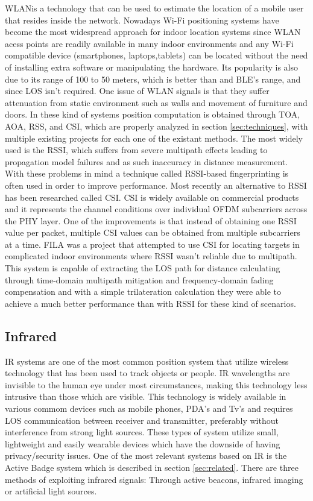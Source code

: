 \ac{WLAN}is a technology that can be used to estimate the location of a mobile user that resides inside the network. Nowadays Wi-Fi positioning systems have become the most widespread approach for indoor location systems since \ac{WLAN} acess points are readily available in many indoor environments and any Wi-Fi compatible device (smartphones, laptops,tablets) can be located without the need of installing extra software or manipulating the hardware. Its popularity is also due to its range of 100 to 50 meters, which is better than  and BLE's range, and since \ac{LOS} isn't required. One issue of \ac{WLAN} signals is that they suffer attenuation from static environment such as walls and movement of furniture and doors. In these kind of systems position computation is obtained through TOA, AOA, RSS, and CSI, which are properly analyzed in section \ref{sec:techniques}, with multiple existing projects for each one of the existant methods. The most widely used is the \ac{RSSI}, which suffers from severe multipath effects leading to propagation model failures and as such inaccuracy in distance measurement. With these problems in mind a technique called RSSI-based fingerprinting is often used in order to improve performance.
Most recently an alternative to RSSI has been researched called \ac{CSI}. \ac{CSI} is widely available on commercial products and it represents the channel conditions over individual OFDM subcarriers across the \ac{PHY} layer. One of the improvements is that instead of obtaining one \ac{RSSI} value per packet, multiple \ac{CSI} values can be obtained from multiple subcarriers at a time. FILA \cite{fila} was a project that attempted to use \ac{CSI} for locating targets in complicated indoor environments where RSSI wasn't reliable due to multipath. This system is capable of extracting the \ac{LOS} path for distance calculating through time-domain multipath mitigation and frequency-domain fading compensation and with a simple trilateration calculation they were able to achieve a much better performance than with \ac{RSSI} for these kind of scenarios.

\subsection{Infrared}
\label{subsec:ir}

\ac{IR} systems are one of the most common position system that utilize wireless technology that has been used to track objects or people. \ac{IR} wavelengths are invisible to the human eye under most circumstances, making this technology less intrusive than those which are visible. This technology is widely available in various commom devices such as mobile phones, PDA's and Tv's and requires \ac{LOS} communication between receiver and transmitter, preferably without interference from strong light sources. These types of system utilize small, lightweight and easily wearable devices which have the downside of having privacy/security issues. One of the most relevant systems based on \ac{IR} is the Active Badge system which is described in section \ref{sec:related}. There are three methods of exploiting infrared signals: Through active beacons, infrared imaging or artificial light sources.

